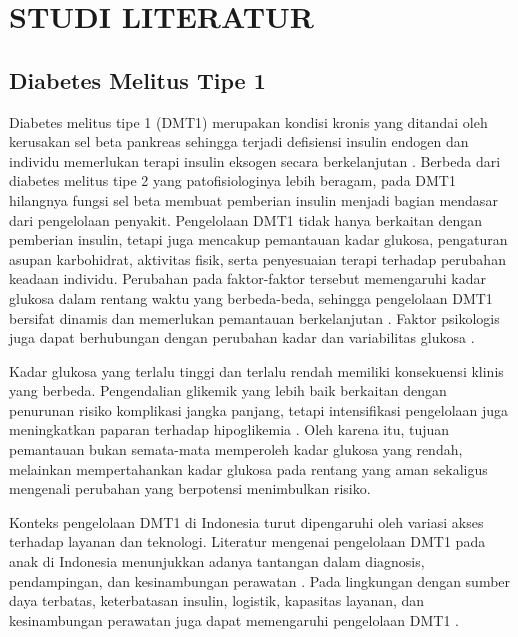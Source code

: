 \cleardoublepage
\chapter{STUDI LITERATUR}
\label{chap:studi-literatur}

\section{Diabetes Melitus Tipe 1}
\label{sec:bab2-dmt1}

Diabetes melitus tipe 1 (DMT1) merupakan kondisi kronis yang ditandai oleh kerusakan sel beta pankreas sehingga terjadi defisiensi insulin endogen dan individu memerlukan 
terapi insulin eksogen secara berkelanjutan \parencite{ada2026}. Berbeda dari diabetes melitus tipe 2 yang patofisiologinya lebih beragam, pada DMT1 hilangnya
fungsi sel beta membuat pemberian insulin menjadi bagian mendasar dari pengelolaan penyakit. Pengelolaan DMT1 tidak hanya berkaitan dengan pemberian insulin, tetapi
juga mencakup pemantauan kadar glukosa, pengaturan asupan karbohidrat, aktivitas fisik, serta penyesuaian terapi terhadap perubahan keadaan individu. Perubahan pada
faktor-faktor tersebut memengaruhi kadar glukosa dalam rentang waktu yang berbeda-beda, sehingga pengelolaan DMT1 bersifat dinamis dan memerlukan pemantauan
berkelanjutan \parencite{ada2026,colberg2016}. Faktor psikologis juga dapat berhubungan dengan perubahan kadar dan variabilitas glukosa \parencite{velasco2022}.

Kadar glukosa yang terlalu tinggi dan terlalu rendah memiliki konsekuensi klinis yang berbeda. Pengendalian glikemik yang lebih baik berkaitan dengan penurunan risiko
komplikasi jangka panjang, tetapi intensifikasi pengelolaan juga meningkatkan paparan terhadap hipoglikemia \parencite{nathan2014}. Oleh karena itu, tujuan pemantauan
bukan semata-mata memperoleh kadar glukosa yang rendah, melainkan mempertahankan kadar glukosa pada rentang yang aman sekaligus mengenali perubahan yang berpotensi
menimbulkan risiko.

Konteks pengelolaan DMT1 di Indonesia turut dipengaruhi oleh variasi akses terhadap layanan dan teknologi. Literatur mengenai 
pengelolaan DMT1 pada anak di Indonesia menunjukkan adanya tantangan dalam diagnosis, pendampingan, dan kesinambungan perawatan \parencite{pulungan2021,faizi2025}. 
Pada lingkungan dengan sumber daya terbatas, keterbatasan insulin, logistik, kapasitas layanan, dan kesinambungan perawatan juga dapat memengaruhi pengelolaan 
DMT1 \parencite{owusu2024}.

